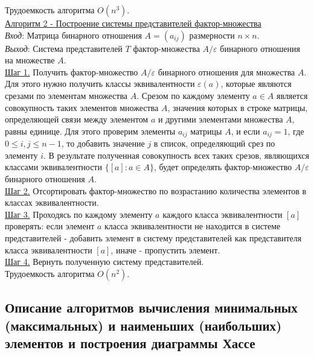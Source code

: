\documentclass[bachelor, och, labwork]{shiza}
\begin{document}
            Трудоемкость алгоритма $O(n^3)$.\\

        \underline{Алгоритм 2 - Построение системы представителей фактор-множества}\\
            \textit{Вход}: Матрица бинарного отношения $A = (a_{ij})$ размерности $n \times n$.\\
            \textit{Выход}: Система представителей $T$ фактор-множества $A/\varepsilon$ бинарного отношения на множестве $A$.\\
            \underline{Шаг 1.} Получить фактор-множество $A/\varepsilon$ бинарного отношения для множества $A$. Для
            этого нужно получить классы эквивалентности $\varepsilon(a)$, которые являются срезами по элементам
            множества $A$. Срезом по каждому элементу $a \in A$ является совокупность таких элементов множества $A$, значения которых в строке матрицы, определяющей связи между элементом $a$ и другими элементами множества $A$, равны единице. Для этого проверим элементы $a_{ij}$ матрицы $A$, и если $a_{ij} = 1$, где $0 \leq i, j \leq n - 1$, то добавить значение $j$ в список, определяющий срез по элементу $i$. В результате полученная совокупность всех таких срезов, являющихся классами эквивалентности $\{[a]: a \in A\}$, будет определять фактор-множество $A/\varepsilon$ бинарного отношения $A$.\\ 
            \underline{Шаг 2.} Отсортировать фактор-множество по возрастанию количества элементов в классах эквивалентности.\\
            \underline{Шаг 3.} Проходясь по каждому элементу $a$ каждого класса эквивалентности $[a]$ проверять: если элемент $a$ класса эквивалентности не находится в системе представителей - добавить элемент в систему представителей как представителя класса эквивалентности $[a]$, иначе - пропустить элемент.\\
            \underline{Шаг 4.} Вернуть полученную систему представителей.\\
            
            Трудоемкость алгоритма $O(n^2)$.\\

    \subsection{Описание  алгоритмов  вычисления  минимальных  (максимальных)  и  наименьших (наибольших) элементов и
    построения диаграммы Хассе}
\end{document}
